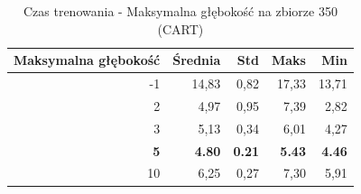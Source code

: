 \begin{table}[htbp]
\centering
\small
\setlength{\tabcolsep}{6pt}
\renewcommand{\arraystretch}{1.2}
\caption{Czas trenowania - Maksymalna głębokość na zbiorze 350 (CART)}
\label{tab:CART_max_depth_350_time}
\begin{tabular}{r|r|r|r|r}
\toprule
Maksymalna głębokość & Średnia & Std & Maks & Min \\
\hline
-1 & 14,83 & 0,82 & 17,33 & 13,71 \\
2 & 4,97 & 0,95 & 7,39 & 2,82 \\
3 & 5,13 & 0,34 & 6,01 & 4,27 \\
\textbf{5} & \textbf{4.80} & \textbf{0.21} & \textbf{5.43} & \textbf{4.46} \\
10 & 6,25 & 0,27 & 7,30 & 5,91 \\
\bottomrule
\end{tabular}
\end{table}